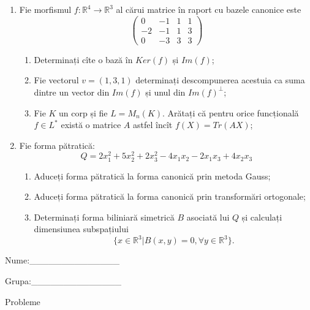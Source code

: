 \documentclass{article}
\begin{document}
\begin{enumerate}
 \item Fie morfismul $f:\mathbb{R}^4 \to \mathbb{R}^3$ al cărui matrice în raport cu bazele canonice este
$$\begin{pmatrix}
0&-1&1&1\\
-2&-1&1&3\\
0&-3&3&3
\end{pmatrix}$$

\begin{enumerate}
\item Determinați cîte o bază în $Ker(f)$ și $Im(f)$;
\item Fie vectorul $v=(1,3,1)$ determinați descompunerea acestuia ca suma dintre un vector din $Im(f)$ și unul din $Im(f)^\perp$;
\item Fie $K$ un corp și fie $L=M_n(K)$. Arătați că pentru orice funcțională $f \in L^*$ există o matrice $A$ astfel încît $f(X)=Tr(AX)$;
\end{enumerate}
\item Fie forma pătratică:
$$Q= 2x_1^2+5x_2^2+2x_3^2-4x_1x_2-2x_1x_3+4x_2x_3$$

\begin{enumerate}
\item Aduceți forma pătratică la forma canonică prin metoda Gauss;
\item Aduceți forma pătratică la forma canonică prin transformări ortogonale;
\item Determinați forma biliniară simetrică $B$ asociată lui $Q$ și calculați dimensiunea subspațiului
$$\{x \in \mathbb{R}^3 | B(x,y)=0,\forall y \in \mathbb{R}^3\}.$$

\end{enumerate}
\end{enumerate}
\newpage
\begin{flushright}
Nume:\_\_\_\_\_\_\_\_\_\_\_\_\_\_
 
 
Grupa:\_\_\_\_\_\_\_\_\_\_\_\_\_\_
\end{flushright}
\begin{center}
\vspace{2cm}
{\Large Probleme}
\vspace{2cm}
\end{center}
\end{document}
